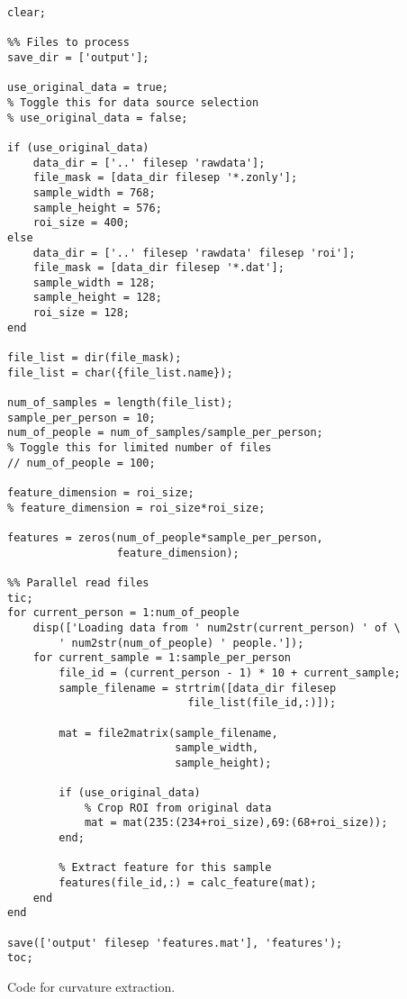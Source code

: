 \begin{verbatim}
clear;

%% Files to process
save_dir = ['output'];

use_original_data = true;
% Toggle this for data source selection
% use_original_data = false;

if (use_original_data)
    data_dir = ['..' filesep 'rawdata'];
    file_mask = [data_dir filesep '*.zonly'];
    sample_width = 768;
    sample_height = 576;
    roi_size = 400;
else
    data_dir = ['..' filesep 'rawdata' filesep 'roi'];
    file_mask = [data_dir filesep '*.dat'];
    sample_width = 128;
    sample_height = 128;
    roi_size = 128;
end

file_list = dir(file_mask);
file_list = char({file_list.name});

num_of_samples = length(file_list);
sample_per_person = 10;
num_of_people = num_of_samples/sample_per_person;
% Toggle this for limited number of files
// num_of_people = 100;

feature_dimension = roi_size;
% feature_dimension = roi_size*roi_size;

features = zeros(num_of_people*sample_per_person,
                 feature_dimension);

%% Parallel read files
tic;
for current_person = 1:num_of_people
    disp(['Loading data from ' num2str(current_person) ' of \
		' num2str(num_of_people) ' people.']);
    for current_sample = 1:sample_per_person
        file_id = (current_person - 1) * 10 + current_sample;
        sample_filename = strtrim([data_dir filesep 
							file_list(file_id,:)]);
        
        mat = file2matrix(sample_filename,
						  sample_width,
						  sample_height);
        
        if (use_original_data)
            % Crop ROI from original data
            mat = mat(235:(234+roi_size),69:(68+roi_size));
        end;
        
        % Extract feature for this sample
        features(file_id,:) = calc_feature(mat);
    end
end

save(['output' filesep 'features.mat'], 'features');
toc;
\end{verbatim}
\clearpage

Code for curvature extraction.


